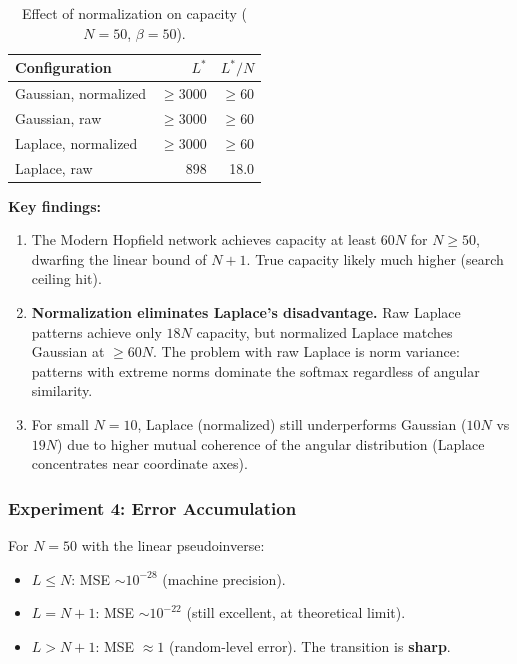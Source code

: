 \documentclass[11pt]{article}
\theoremstyle{definition}
\theoremstyle{remark}
\begin{document}
\begin{table}[h]
\centering
\caption{Effect of normalization on capacity ($N = 50$, $\beta = 50$).}
\begin{tabular}{l r r}
\toprule
Configuration & $L^*$ & $L^*/N$ \\
\midrule
Gaussian, normalized & $\geq 3000$ & $\geq 60$ \\
Gaussian, raw & $\geq 3000$ & $\geq 60$ \\
Laplace, normalized & $\geq 3000$ & $\geq 60$ \\
Laplace, raw & 898 & 18.0 \\
\bottomrule
\end{tabular}
\label{tab:normalization}
\end{table}

\textbf{Key findings:}
\begin{enumerate}
    \item The Modern Hopfield network achieves capacity at least $60N$ for $N \geq 50$, dwarfing the linear bound of $N + 1$. True capacity likely much higher (search ceiling hit).
    \item \textbf{Normalization eliminates Laplace's disadvantage.} Raw Laplace patterns achieve only $18N$ capacity, but normalized Laplace matches Gaussian at $\geq 60N$. The problem with raw Laplace is norm variance: patterns with extreme norms dominate the softmax regardless of angular similarity.
    \item For small $N = 10$, Laplace (normalized) still underperforms Gaussian ($10N$ vs $19N$) due to higher mutual coherence of the angular distribution (Laplace concentrates near coordinate axes).
\end{enumerate}

\subsubsection{Experiment 4: Error Accumulation}

For $N = 50$ with the linear pseudoinverse:
\begin{itemize}
    \item $L \leq N$: MSE $\sim 10^{-28}$ (machine precision).
    \item $L = N + 1$: MSE $\sim 10^{-22}$ (still excellent, at theoretical limit).
    \item $L > N + 1$: MSE $\approx 1$ (random-level error). The transition is \textbf{sharp}.
\end{itemize}
\end{document}
